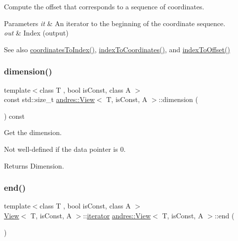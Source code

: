 Compute the offset that corresponds to a sequence of coordinates.


\begin{DoxyParams}{Parameters}
{\em it} & An iterator to the beginning of the coordinate sequence. \\
\hline
{\em out} & Index (output) \\
\hline
\end{DoxyParams}
\begin{DoxySeeAlso}{See also}
\hyperlink{classandres_1_1View_a49931615f15546e6794aefc0cd1b508e}{coordinates\+To\+Index()}, \hyperlink{classandres_1_1View_a4162a6266478800ff5f64998b3a703fb}{index\+To\+Coordinates()}, and \hyperlink{classandres_1_1View_af0e5f1df969af5aeba3175f1be77923d}{index\+To\+Offset()} 
\end{DoxySeeAlso}
\mbox{\label{classandres_1_1View_a836c6755b62d6e619d043adcf8b91fab}} 
\subsubsection{\texorpdfstring{dimension()}{dimension()}}
{\footnotesize\ttfamily template$<$class T , bool is\+Const, class A $>$ \\
const std\+::size\+\_\+t \hyperlink{classandres_1_1View}{andres\+::\+View}$<$ T, is\+Const, A $>$\+::dimension (\begin{DoxyParamCaption}{ }\end{DoxyParamCaption}) const\hspace{0.3cm}{\ttfamily [inline]}}

Get the dimension.

Not well-\/defined if the data pointer is 0.

\begin{DoxyReturn}{Returns}
Dimension. 
\end{DoxyReturn}
\mbox{\label{classandres_1_1View_af778a1e9839f2f90e503514e36d41b78}} 
\subsubsection{\texorpdfstring{end()}{end()}\hspace{0.1cm}{\footnotesize\ttfamily [1/2]}}
{\footnotesize\ttfamily template$<$class T , bool is\+Const, class A $>$ \\
\hyperlink{classandres_1_1View}{View}$<$ T, is\+Const, A $>$\+::\hyperlink{classandres_1_1View_aef54ee0a58e755b897398493d05a44df}{iterator} \hyperlink{classandres_1_1View}{andres\+::\+View}$<$ T, is\+Const, A $>$\+::end (\begin{DoxyParamCaption}{ }\end{DoxyParamCaption})\hspace{0.3cm}{\ttfamily [inline]}}

